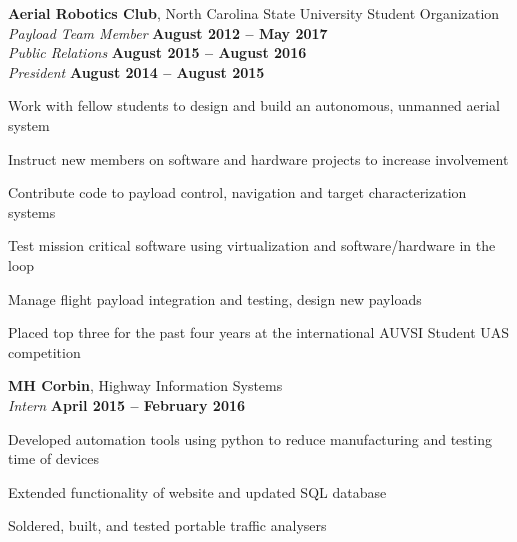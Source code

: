 \documentclass[margin,line]{resume}
\begin{document}
\begin{resume}
\begin{list2}
    \end{list2}
    \vspace{3mm}




    \textbf{Aerial Robotics Club}, North Carolina State University Student Organization\\
    \textsl{Payload Team Member} \hfill \textbf{August 2012 -- May 2017}\\
    \textsl{Public Relations} \hfill \textbf{August 2015 -- August 2016}\\
    \textsl{President} \hfill \textbf{August 2014 -- August 2015}\\
    \vspace{-3mm}
    \begin{list2}
    \item Work with fellow students to design and build an autonomous, unmanned aerial system
    \item Instruct new members on software and hardware projects to increase involvement
    \item Contribute code to payload control, navigation and target characterization systems
    \item Test mission critical software using virtualization and software/hardware in the loop
	\item Manage flight payload integration and testing, design new payloads
    \item Placed top three for the past four years at the international AUVSI Student UAS competition
    \end{list2}
    \vspace{3mm}




    \textbf{MH Corbin}, Highway Information Systems\\
    \textsl{Intern}  \hfill \textbf{April 2015 -- February 2016} \\
    \vspace{-4mm}
    \begin{list2}
    \item Developed automation tools using python to reduce manufacturing and testing time of devices
    \item Extended functionality of website and updated SQL database
    \item Soldered, built, and tested portable traffic analysers
    \end{list2}
    \vspace{3mm}




\end{resume}
\end{document}
